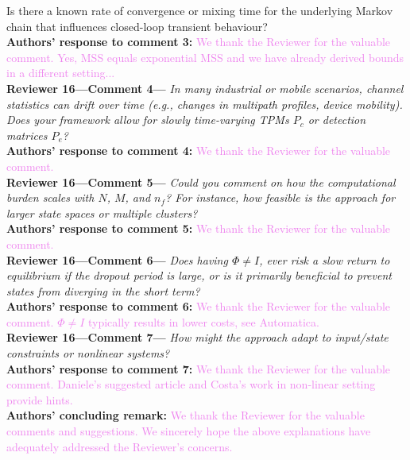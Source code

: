 \begin{bibunit}
{Is there a known rate of convergence or mixing time for the underlying Markov chain that
influences closed-loop transient behaviour?}\\[2mm]
\textbf{Authors' response to comment 3:} \textcolor{violet}{We thank the Reviewer for the valuable comment. Yes, MSS equals exponential MSS and we have already derived bounds in a different setting...}\\[4mm]
\textbf{Reviewer 16---Comment 4---}\textit{%
In many industrial or mobile scenarios, channel statistics can drift over time (e.g., changes in multipath profiles, device mobility). 
Does your framework allow for slowly time-varying TPMs $P_c$ or detection matrices $P_e$?}\\[2mm]
\textbf{Authors' response to comment 4:} \textcolor{violet}{We thank the Reviewer for the valuable comment. }\\[4mm]
\textbf{Reviewer 16---Comment 5---}\textit{%
Could you comment on how the computational burden scales with $N$, $M$, and $n_f$? 
For instance, how feasible is the approach for larger state spaces or multiple clusters?}\\[2mm]
\textbf{Authors' response to comment 5:} \textcolor{violet}{We thank the Reviewer for the valuable comment. }\\[4mm]
\textbf{Reviewer 16---Comment 6---}\textit{%
Does having $\Phi\neq I$, ever risk a slow return to equilibrium if the dropout period is large, or is it primarily beneficial to prevent states from diverging in the short term?}\\[2mm]
\textbf{Authors' response to comment 6:} \textcolor{violet}{We thank the Reviewer for the valuable comment. $\Phi\neq I$ typically results in lower costs, see Automatica.}\\[4mm]
\textbf{Reviewer 16---Comment 7---}\textit{%
How might the approach adapt to input/state constraints or nonlinear systems?}\\[2mm]
\textbf{Authors' response to comment 7:} \textcolor{violet}{We thank the Reviewer for the valuable comment. Daniele's suggested article and Costa's work in non-linear setting provide hints.}\\[4mm]
\textbf{Authors' concluding remark:} \textcolor{violet}{We thank the Reviewer for the valuable comments and suggestions. We sincerely hope the above explanations have adequately addressed the Reviewer's concerns.}
\putbib
\end{bibunit}